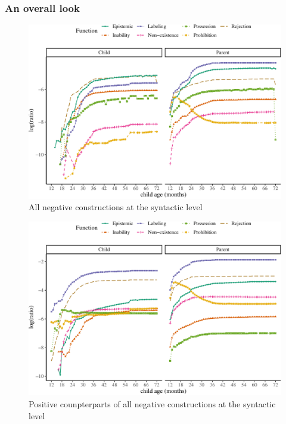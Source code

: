 \documentclass[
  english,
  man,floatsintext]{apa6}
\begin{document}
\clearpage

\hypertarget{an-overall-look}{%
\subsubsection{An overall look}\label{an-overall-look}}

\begin{figure}[H]

{\centering \includegraphics{neg_construction_article_files/figure-latex/allneg-1} 

}

\caption{All negative constructions at the syntactic level}\label{fig:allneg}
\end{figure}

\clearpage

\begin{figure}[H]

{\centering \includegraphics{neg_construction_article_files/figure-latex/allpos-1} 

}

\caption{Positive counpterparts of all negative constructions at the syntactic level}\label{fig:allpos}
\end{figure}
\end{document}
